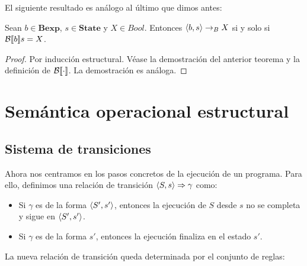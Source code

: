 El siguiente resultado es análogo al último que dimos antes:
\begin{prop}
Sean $b \in \mathbf{Bexp}$, $s \in \mathbf{State}$ y $X \in Bool$. Entonces $\langle b, s \rangle\rightarrow_B X$ si y solo si $\mathcal{B}[\![b]\!]s = X$.
\end{prop}
\begin{proof}
Por inducción estructural. Véase la demostración del anterior teorema y la definición de $\mathcal{B}[\![\cdot]\!]$. La demostración es análoga.
\end{proof}

\section{Semántica operacional estructural}

\subsection{Sistema de transiciones}

Ahora nos centramos en los pasos concretos de la ejecución de un programa. Para ello, definimos una relación de transición $\langle S, s \rangle \Rightarrow \gamma$ como:
\begin{itemize}
    \item Si $\gamma$ es de la forma $\langle S', s' \rangle$, entonces la ejecución de $S$ desde $s$ no se completa y sigue en $\langle S', s' \rangle$.
    \item Si $\gamma$ es de la forma $s'$, entonces la ejecución finaliza en el estado $s'$.
\end{itemize}
La nueva relación de transición queda determinada por el conjunto de reglas:

